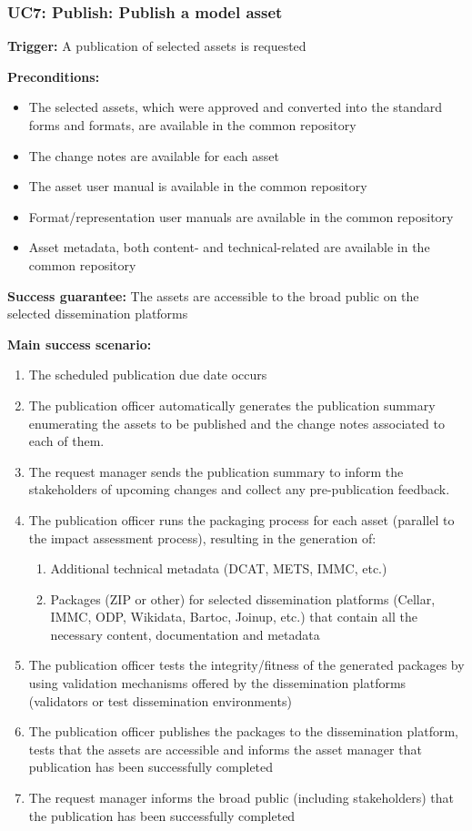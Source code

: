 	\subsubsection{UC7: Publish: Publish a model asset}
	\label{sec:uc7}
		
	\textbf{Trigger:} A publication of selected assets is requested
	
	\textbf{Preconditions:} 
	\begin{itemize}
		\item The selected assets, which were approved and converted into the standard forms and formats, are available in the common repository
		\item The change notes are available for each asset
		\item The asset user manual is available in the common repository
		\item Format/representation user manuals are available in the common repository
		\item Asset metadata, both content- and technical-related are available in the common repository
	\end{itemize}
	
	\textbf{Success guarantee:} The assets are accessible to the broad public on the selected dissemination platforms
	
	\textbf{Main success scenario:} 
	\begin{enumerate}
		\item The scheduled publication due date occurs
		\item The publication officer automatically generates the publication summary enumerating the assets to be published and the change notes associated to each of them. 
		\item The request manager sends the publication summary to inform the stakeholders of upcoming changes and collect any pre-publication feedback.
		\item The publication officer runs the packaging process for each asset (parallel to the impact assessment process), resulting in the generation of: 
		\begin{enumerate}
		\item Additional technical metadata (DCAT, METS, IMMC, etc.)
		\item Packages (ZIP or other) for selected dissemination platforms (Cellar, IMMC, ODP, Wikidata, Bartoc, Joinup, etc.) that contain all the necessary content, documentation and metadata
		\end{enumerate}
		\item The publication officer tests the integrity/fitness of the generated packages by using validation mechanisms offered by the dissemination platforms (validators or test dissemination environments)
		\item The publication officer publishes the packages to the dissemination platform, tests that the assets are accessible and informs the asset manager that publication has been successfully completed
		\item The request manager informs the broad public (including stakeholders) that the publication has been successfully completed
		
	\end{enumerate}
		
